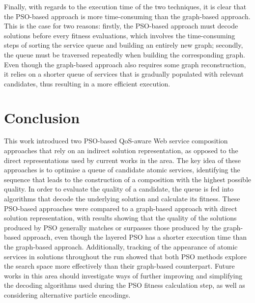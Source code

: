 \documentclass{llncs}
\begin{document}
Finally, with regards to the execution time of the two techniques, it is clear that the PSO-based approach is more time-consuming than the graph-based approach. This is the case for two reasons: firstly, the PSO-based approach must decode solutions before every fitness evaluations, which involves the time-consuming steps of sorting the service queue and building an entirely new graph; secondly, the queue must be traversed repeatedly when building the corresponding graph. Even though the graph-based approach also requires some graph reconstruction, it relies on a shorter queue of services that is gradually populated with relevant candidates, thus resulting in a more efficient execution.

\section{Conclusion}\label{conclusion}

This work introduced two PSO-based QoS-aware Web service composition approaches that rely on an indirect solution representation, as opposed to the direct representations used by current works in the area. The key idea of these approaches is to optimise a queue of candidate atomic services, identifying the sequence that leads to the construction of a composition with the highest possible quality. In order to evaluate the quality of a candidate, the queue is fed into algorithms that decode the underlying solution and calculate its fitness. These PSO-based approaches were compared to a graph-based approach with direct solution representation, with results showing that the quality of the solutions produced by PSO generally matches or surpasses those produced by the graph-based approach, even though the layered PSO has a shorter execution time than the graph-based approach. Additionally, tracking of the appearance of atomic services in solutions throughout the run showed that both PSO methods explore the search space more effectively than their graph-based counterpart. Future works in this area should investigate ways of further improving and simplifying the decoding algorithms used during the PSO fitness calculation step, as well as considering alternative particle encodings.



\end{document}
